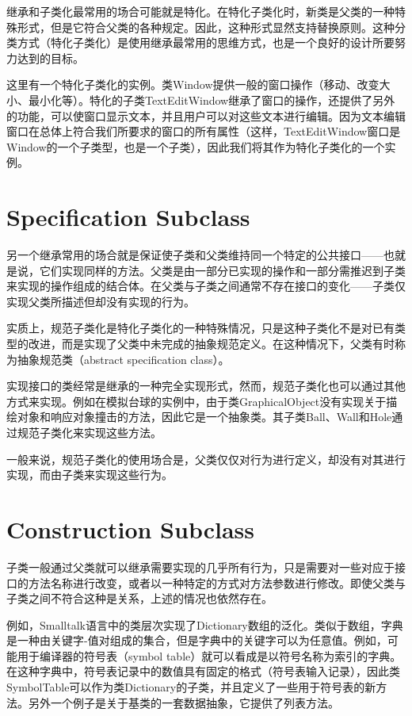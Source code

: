 继承和子类化最常用的场合可能就是特化。在特化子类化时，新类是父类的一种特殊形式，但是它符合父类的各种规定。因此，这种形式显然支持替换原则。这种分类方式（特化子类化）是使用继承最常用的思维方式，也是一个良好的设计所要努力达到的目标。

这里有一个特化子类化的实例。类Window提供一般的窗口操作（移动、改变大小、最小化等）。特化的子类TextEditWindow继承了窗口的操作，还提供了另外的功能，可以使窗口显示文本，并且用户可以对这些文本进行编辑。因为文本编辑窗口在总体上符合我们所要求的窗口的所有属性（这样，TextEditWindow窗口是Window的一个子类型，也是一个子类），因此我们将其作为特化子类化的一个实例。



\section{Specification Subclass}

另一个继承常用的场合就是保证使子类和父类维持同一个特定的公共接口——也就是说，它们实现同样的方法。父类是由一部分已实现的操作和一部分需推迟到子类来实现的操作组成的结合体。在父类与子类之间通常不存在接口的变化——子类仅实现父类所描述但却没有实现的行为。

实质上，规范子类化是特化子类化的一种特殊情况，只是这种子类化不是对已有类型的改进，而是实现了父类中未完成的抽象规范定义。在这种情况下，父类有时称为抽象规范类（abstract specification class）。

实现接口的类经常是继承的一种完全实现形式，然而，规范子类化也可以通过其他方式来实现。例如在模拟台球的实例中，由于类GraphicalObject没有实现关于描绘对象和响应对象撞击的方法，因此它是一个抽象类。其子类Ball、Wall和Hole通过规范子类化来实现这些方法。

一般来说，规范子类化的使用场合是，父类仅仅对行为进行定义，却没有对其进行实现，而由子类来实现这些行为。

\section{Construction Subclass}

子类一般通过父类就可以继承需要实现的几乎所有行为，只是需要对一些对应于接口的方法名称进行改变，或者以一种特定的方式对方法参数进行修改。即使父类与子类之间不符合这种是关系，上述的情况也依然存在。

例如，Smalltalk语言中的类层次实现了Dictionary数组的泛化。类似于数组，字典是一种由关键字-值对组成的集合，但是字典中的关键字可以为任意值。例如，可能用于编译器的符号表（symbol table）就可以看成是以符号名称为索引的字典。在这种字典中，符号表记录中的数值具有固定的格式（符号表输入记录），因此类SymbolTable可以作为类Dictionary的子类，并且定义了一些用于符号表的新方法。另外一个例子是关于基类的一套数据抽象，它提供了列表方法。

